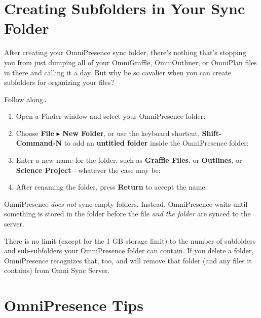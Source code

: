\documentclass[../main.tex]{subfiles}
\begin{document}
\section{Creating Subfolders in Your Sync Folder}

After creating your OmniPresence sync folder, there's nothing that's stopping you from just
dumping all of your OmniGraffle, OmniOutliner, or OmniPlan files in there and calling it a
day. But why be so cavalier when you can create subfolders for organizing your files?

Follow along\ldots{}

\begin{enumerate}
  \item Open a Finder window and select your OmniPresence folder:

  \item Choose \textbf{File} $\blacktriangleright$ \textbf{New Folder}, or use the keyboard
    shortcut, \textbf{Shift-Command-N} to add an \textbf{untitled folder} inside the
    OmniPresence folder:

  \item Enter a new name for the folder, such as \textbf{Graffle Files}, or \textbf{Outlines},
    or \textbf{Science Project}---whatever the case may be:

  \item After renaming the folder, press \textbf{Return} to accept the name:

\end{enumerate}

\begin{ognote}
  OmniPresence \textit{does not} sync empty folders. Instead, OmniPresence waits until something
  is stored in the folder before the file \textit{and the folder} are synced to the server.
\end{ognote}

There is no limit (except for the 1 GB storage limit) to the number of subfolders and
sub-subfolders your OmniPresence folder can contain. If you delete a folder, OmniPresence
recognizes that, too, and will remove that folder (and any files it contains) from Omni Sync
Server.

\section{OmniPresence Tips}
\end{document}
